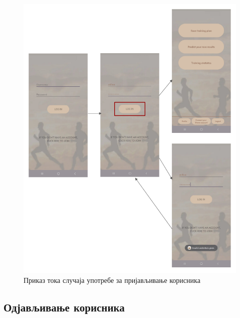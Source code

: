 \documentclass[12pt,oneside]{memoir}
\begin{document}
\begin{figure}[H]
  \centering
  \includegraphics[scale=0.9]{assets/pictures/usecases_flows/login_flow.png}
    \caption{Приказ тока случаја употребе за пријављивање корисника}
  \label{pic:login-flow}
\end{figure}


\newpage

\subsection*{Одјављивање корисника}
\end{document}
